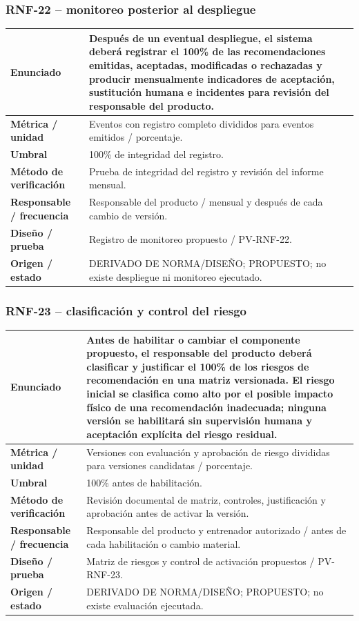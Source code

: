 \documentclass[11pt,a4paper,twoside]{article}
\begin{document}
\subsubsection{RNF-22 -- monitoreo posterior al despliegue}
\begin{tabularx}{\textwidth}{|>{\bfseries}p{4.0cm}|X|}\hline
Enunciado & Después de un eventual despliegue, el sistema deberá registrar el 100\% de las recomendaciones emitidas, aceptadas, modificadas o rechazadas y producir mensualmente indicadores de aceptación, sustitución humana e incidentes para revisión del responsable del producto. \\ \hline
Métrica / unidad & Eventos con registro completo divididos para eventos emitidos / porcentaje. \\ \hline
Umbral & 100\% de integridad del registro. \\ \hline
Método de verificación & Prueba de integridad del registro y revisión del informe mensual. \\ \hline
Responsable / frecuencia & Responsable del producto / mensual y después de cada cambio de versión. \\ \hline
Diseño / prueba & Registro de monitoreo propuesto / PV-RNF-22. \\ \hline
Origen / estado & DERIVADO DE NORMA/DISEÑO; PROPUESTO; no existe despliegue ni monitoreo ejecutado. \\ \hline
\end{tabularx}

\subsubsection{RNF-23 -- clasificación y control del riesgo}
\begin{tabularx}{\textwidth}{|>{\bfseries}p{4.0cm}|X|}\hline
Enunciado & Antes de habilitar o cambiar el componente propuesto, el responsable del producto deberá clasificar y justificar el 100\% de los riesgos de recomendación en una matriz versionada. El riesgo inicial se clasifica como alto por el posible impacto físico de una recomendación inadecuada; ninguna versión se habilitará sin supervisión humana y aceptación explícita del riesgo residual. \\ \hline
Métrica / unidad & Versiones con evaluación y aprobación de riesgo divididas para versiones candidatas / porcentaje. \\ \hline
Umbral & 100\% antes de habilitación. \\ \hline
Método de verificación & Revisión documental de matriz, controles, justificación y aprobación antes de activar la versión. \\ \hline
Responsable / frecuencia & Responsable del producto y entrenador autorizado / antes de cada habilitación o cambio material. \\ \hline
Diseño / prueba & Matriz de riesgos y control de activación propuestos / PV-RNF-23. \\ \hline
Origen / estado & DERIVADO DE NORMA/DISEÑO; PROPUESTO; no existe evaluación ejecutada. \\ \hline
\end{tabularx}
\end{document}
